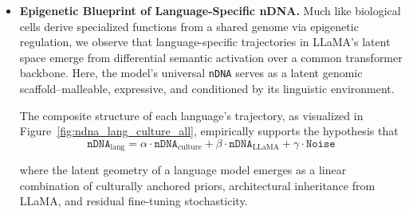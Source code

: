 \begin{itemize}[leftmargin=1.5em]
  \item \textbf{Epigenetic Blueprint of Language-Specific nDNA.}
    Much like biological cells derive specialized functions from a shared genome via epigenetic regulation, we observe that language-specific trajectories in LLaMA’s latent space emerge from differential semantic activation over a common transformer backbone. Here, the model’s universal \texttt{nDNA} serves as a latent genomic scaffold--malleable, expressive, and conditioned by its linguistic environment. 
    
    The composite structure of each language’s trajectory, as visualized in Figure~\ref{fig:ndna_lang_culture_all}, empirically supports the hypothesis that
    \[
    \boxed{
    \texttt{nDNA}_{\text{lang}} = \alpha \cdot \texttt{nDNA}_{\text{culture}} + \beta \cdot \texttt{nDNA}_{\text{LLaMA}} + \gamma \cdot \texttt{Noise}
    }
    \]
    
    where the latent geometry of a language model emerges as a linear combination of culturally anchored priors, architectural inheritance from LLaMA, and residual fine-tuning stochasticity.
\end{itemize}

    
\clearpage  








